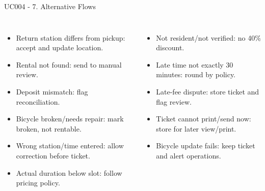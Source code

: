 \documentclass[aspectratio=169,10pt]{beamer}
\newcommand{\tightitems}{\setlength{\itemsep}{2pt}\setlength{\parskip}{0pt}}
\begin{document}
\begin{frame}{UC004 - 7. Alternative Flows}
\footnotesize
\begin{columns}[T,onlytextwidth]
\begin{itemize}\tightitems
  \item Return station differs from pickup: accept and update location.
  \item Rental not found: send to manual review.
  \item Deposit mismatch: flag reconciliation.
  \item Bicycle broken/needs repair: mark broken, not rentable.
  \item Wrong station/time entered: allow correction before ticket.
  \item Actual duration below slot: follow pricing policy.
\end{itemize}
\begin{itemize}\tightitems
  \item Not resident/not verified: no 40\% discount.
  \item Late time not exactly 30 minutes: round by policy.
  \item Late-fee dispute: store ticket and flag review.
  \item Ticket cannot print/send now: store for later view/print.
  \item Bicycle update fails: keep ticket and alert operations.
\end{itemize}
\end{columns}
\end{frame}
\end{document}
